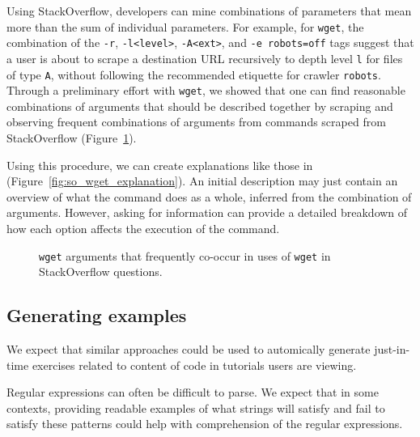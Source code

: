 Using StackOverflow, developers can mine combinations of parameters that mean more than the sum of individual parameters.
For example, for \texttt{wget}, the combination of the \texttt{-r}, \texttt{-l<level>}, \texttt{-A<ext>}, and \texttt{-e robots=off} tags suggest that a user is about to scrape a destination URL recursively to depth level \texttt{l} for files of type \texttt{A}, without following the recommended etiquette for crawler \texttt{robots}.
Through a preliminary effort with \texttt{wget}, we showed that one can find reasonable combinations of arguments that should be described together by scraping and observing frequent combinations of arguments from commands scraped from StackOverflow (Figure~\ref{fig:wget_arguments}).

Using this procedure, we can create explanations like those in (Figure~\ref{fig:so_wget_explanation}).
An initial description may just contain an overview of what the command does as a whole, inferred from the combination of arguments.
However, asking for information can provide a detailed breakdown of how each option affects the execution of the command.

\begin{figure}
\caption{\texttt{wget} arguments that frequently co-occur in uses of \texttt{wget} in StackOverflow questions. }
\label{fig:wget_arguments}
\end{figure}


\subsection{Generating examples}

We expect that similar approaches could be used to automically generate just-in-time exercises related to content of code in tutorials users are viewing. 

Regular expressions can often be difficult to parse.
We expect that in some contexts, providing readable examples of what strings will satisfy and fail to satisfy these patterns could help with comprehension of the regular expressions.


